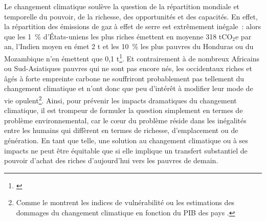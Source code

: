 \documentclass[a5paper,french]{memoir}
\begin{document}
Le changement climatique soulève la question de la répartition mondiale et temporelle du pouvoir, de la richesse, des opportunités et des capacités. En effet, la répartition des émissions de gaz à effet de serre est extrêmement inégale~: alors que les 1~\% d'États-uniens les plus riches émettent en moyenne 318 tCO$_\text{2}$e par an, l'Indien moyen en émet 2 t et les 10~\% les plus pauvres du Honduras ou du Mozambique n'en émettent que 0,1 t\footnote{\citet{chancel_carbon_2015}}. Et contrairement à de nombreux Africains ou Sud-Asiatiques pauvres qui ne sont pas encore nés, les occidentaux riches et âgés à forte empreinte carbone ne souffriront probablement pas tellement du changement climatique et n'ont donc que peu d'intérêt à modifier leur mode de vie opulent\footnote{Comme le montrent les indices de vulnérabilité \citep{chen_university_2015} ou les estimations des dommages du changement climatique en fonction du PIB des pays \citep{burke_global_2015}.}. 
Ainsi, pour prévenir les impacts dramatiques du changement climatique, il est trompeur de formuler la question simplement en termes de problème environnemental, car le cœur du problème réside dans les inégalités entre les humains qui diffèrent en termes de richesse, d'emplacement ou de génération. En tant que telle, une solution au changement climatique ou à ses impacts ne peut être équitable que si elle implique un transfert substantiel de pouvoir d'achat des riches d'aujourd'hui %
vers les pauvres de demain.%
\end{document}
